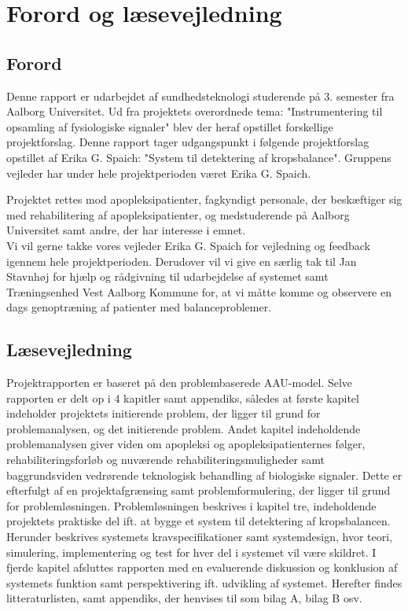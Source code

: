 \chapter*{Forord og læsevejledning}
\section{Forord}
Denne rapport er udarbejdet af sundhedsteknologi studerende på 3. semester fra Aalborg Universitet. Ud fra projektets overordnede tema: "Instrumentering til opsamling af fysiologiske signaler" blev der heraf opstillet forskellige projektforslag. Denne rapport tager udgangspunkt i følgende projektforslag opstillet af Erika G. Spaich: "System til detektering af kropsbalance". Gruppens vejleder har under hele projektperioden været Erika G. Spaich.

Projektet rettes mod apopleksipatienter, fagkyndigt personale, der beskæftiger sig med rehabilitering af apopleksipatienter, og medstuderende på Aalborg Universitet samt andre, der har interesse i emnet. \\
Vi vil gerne takke vores vejleder Erika G. Spaich for vejledning og feedback igennem hele projektperioden. Derudover vil vi give en særlig tak til Jan Stavnhøj for hjælp og rådgivning til udarbejdelse af systemet samt Træningsenhed Vest Aalborg Kommune for, at vi måtte komme og observere en dags genoptræning af patienter med balanceproblemer. 

\section{Læsevejledning}
Projektrapporten er baseret på den problembaserede AAU-model. Selve rapporten er delt op i 4 kapitler samt appendiks, således at første kapitel indeholder projektets initierende problem, der ligger til grund for problemanalysen, og det initierende problem. Andet kapitel indeholdende problemanalysen giver viden om apopleksi og apopleksipatienternes følger, rehabiliteringsforløb og nuværende rehabiliteringsmuligheder samt baggrundsviden vedrørende teknologisk behandling af biologiske signaler.  Dette er efterfulgt af en projektafgrænsing samt problemformulering, der ligger til grund for problemløsningen. Problemløsningen beskrives i kapitel tre, indeholdende projektets praktiske del ift. at bygge et system til detektering af kropsbalancen. Herunder beskrives systemets kravspecifikationer samt systemdesign, hvor teori, simulering, implementering og test for hver del i systemet vil være skildret. I fjerde kapitel afsluttes rapporten med en evaluerende diskussion og konklusion af systemets funktion samt perspektivering ift. udvikling af systemet. Herefter findes litteraturlisten, samt appendiks, der henvises til som bilag A, bilag B osv. 

